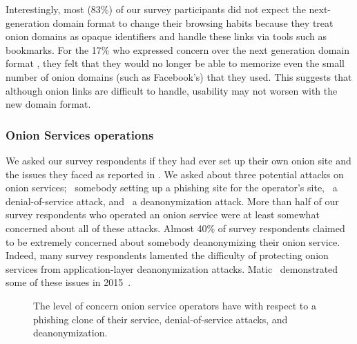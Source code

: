 Interestingly, most (83\%) of our survey participants did not expect the
next-generation domain format to change their browsing habits because they treat onion domains as
opaque identifiers and handle these links via tools such as bookmarks.  For the 17\% who expressed concern over the next generation domain format , they felt that they would no longer be able to memorize even the small
number of onion domains (such as Facebook's) that they used.
 This suggests that although onion links are difficult to handle, usability may not worsen with the new domain format.

\subsubsection{Onion Services operations}
We asked our survey respondents if they had ever set up their own onion site and the issues they faced as reported in .  We asked about three potential attacks on onion services; \first~somebody setting up a
phishing site for the operator's site, \second~a denial-of-service attack, and
\third~a deanonymization attack.  More than half of our survey respondents who operated an onion service were at least
somewhat concerned about all of these attacks.  Almost 40\% of survey respondents claimed to be
extremely concerned about somebody deanonymizing their onion service.  Indeed,
many survey respondents lamented the difficulty of protecting onion services from
application-layer deanonymization attacks.  Matic \ea\ demonstrated some of
these issues in 2015~\cite{Matic2015a}.

\begin{figure}[t]
    \centering
    
    \caption{The level of concern onion service operators have with respect to a
    phishing clone of their service, denial-of-service attacks, and
    deanonymization.}
    \label{fig:onion-operation-concerns}
\end{figure}

